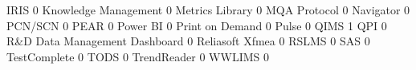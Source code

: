 \documentclass{article}
\begin{document}
\begin{Schunk}
\begin{Soutput}
  IRIS                                                                                   0
  Knowledge Management                                                                   0
  Metrics Library                                                                        0
  MQA Protocol                                                                           0
  Navigator                                                                              0
  PCN/SCN                                                                                0
  PEAR                                                                                   0
  Power BI                                                                               0
  Print on Demand                                                                        0
  Pulse                                                                                  0
  QIMS                                                                                   1
  QPI                                                                                    0
  R&D Data Management Dashboard                                                          0
  Reliasoft Xfmea                                                                        0
  RSLMS                                                                                  0
  SAS                                                                                    0
  TestComplete                                                                           0
  TODS                                                                                   0
  TrendReader                                                                            0
  WWLIMS                                                                                 0
                                                           

\end{Soutput}
\end{Schunk}
\end{document}
